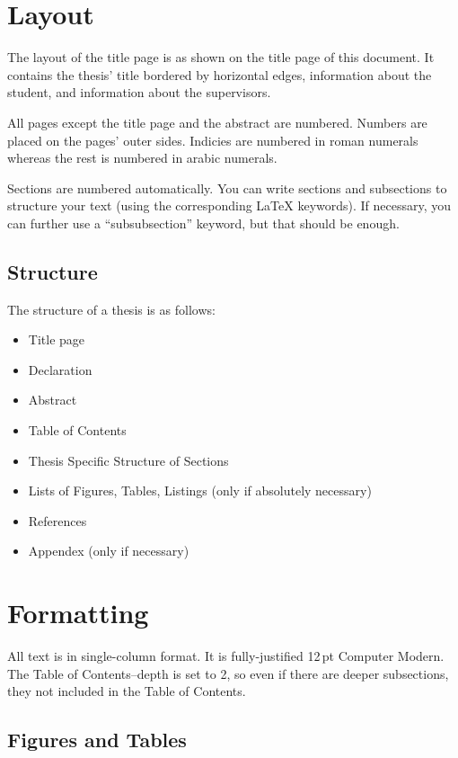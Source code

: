 
\section{Layout}

The layout of the title page is as shown on the title page of this document. It contains the thesis' title bordered by horizontal edges, information about the student, and information about the supervisors.

All pages except the title page and the abstract are numbered. Numbers are placed on the pages' outer sides. Indicies are numbered in roman numerals whereas the rest is numbered in arabic numerals.

Sections are numbered automatically. You can write sections and subsections to structure your text (using the corresponding LaTeX keywords). If necessary, you can further use a ``subsubsection'' keyword, but that should be enough.

  \subsection{Structure}
  The structure of a thesis is as follows:

  \begin{itemize}
      \item Title page
      \item Declaration
      \item Abstract
      \item Table of Contents
      \item Thesis Specific Structure of Sections
      \item Lists of Figures, Tables, Listings (only if absolutely necessary)
      \item References
		\item Appendex (only if necessary)
  \end{itemize}

\section{Formatting}

	All text is in single-column format. It is fully-justified 12\,pt Computer
Modern. The Table of Contents--depth is set to 2, so even if there are deeper
subsections, they not included in the Table of Contents.

  \subsection{Figures and Tables}

